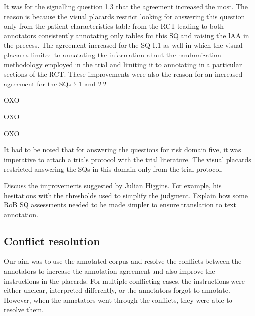 \documentclass[sn-mathphys,Numbered]{sn-jnl}%
\theoremstyle{thmstyleone}%
\theoremstyle{thmstyletwo}%
\theoremstyle{thmstylethree}%
\begin{document}
It was for the signalling question 1.3 that the agreement increased the most. 
The reason is because the visual placards restrict looking for answering this question only from the patient characteristics table from the RCT leading to both annotators consistently annotating only tables for this SQ and raising the IAA in the process.
The agreement increased for the SQ 1.1 as well in which the visual placards limited to annotating the information about the randomization methodology employed in the trial and limiting it to annotating in a particular sections of the RCT.
These improvements were also the reason for an increased agreement for the SQs 2.1 and 2.2.


OXO


OXO


OXO


It had to be noted that for answering the questions for risk domain five, it was imperative to attach a trials protocol with the trial literature.
The visual placards restricted answering the SQs in this domain only from the trial protocol. 


Discuss the improvements suggested by Julian Higgins. For example, his hesitations with the thresholds used to simplify the judgment.
Explain how some RoB SQ assessments needed to be made simpler to ensure translation to text annotation.

%
%
%
\subsection{Conflict resolution}
%
Our aim was to use the annotated corpus and resolve the conflicts between the annotators to increase the annotation agreement and also improve the instructions in the placards.
For multiple conflicting cases, the instructions were either unclear, interpreted differently, or the annotators forgot to annotate.
However, when the annotators went through the conflicts, they were able to resolve them.
\end{document}
